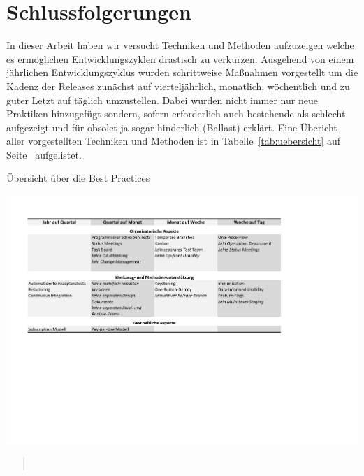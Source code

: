 \section{Schlussfolgerungen}
\label{sec:schlussfolgerungen}

In dieser Arbeit haben wir versucht Techniken und Methoden aufzuzeigen welche
es ermöglichen Entwicklungszyklen drastisch zu verkürzen. Ausgehend von einem
jährlichen Entwicklungszyklus wurden schrittweise Maßnahmen vorgestellt um die
Kadenz der Releases zunächst auf vierteljährlich, monatlich, wöchentlich und
zu guter Letzt auf täglich umzustellen. Dabei wurden nicht immer nur neue
Praktiken hinzugefügt sondern, sofern erforderlich auch bestehende als
schlecht aufgezeigt und für obsolet ja sogar hinderlich (Ballast) erklärt.
Eine Übericht aller vorgestellten Techniken und Methoden ist in
Tabelle~\ref{tab:uebersicht} auf Seite~\pageref{tab:uebersicht} aufgelistet.


\begin{table}[htbp]
    \centering
        \caption{Übersicht über die Best Practices}
        \includegraphics[trim = 50bp 265bp 185bp 56bp, clip, width=1.00\textwidth]{uebersicht}
    \label{tab:uebersicht}
\end{table}

\begin{quote}
~\cite{digg4}
\end{quote}

